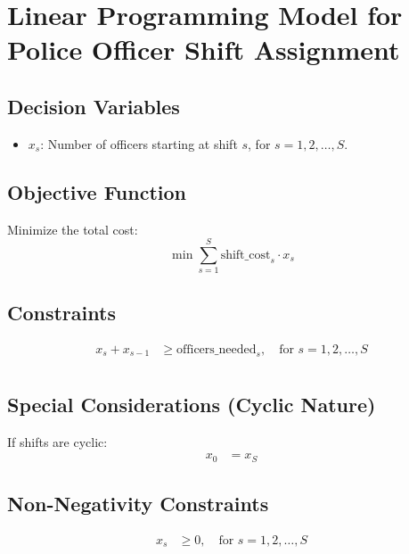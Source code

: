 \documentclass{article}
\begin{document}
\section*{Linear Programming Model for Police Officer Shift Assignment}

\subsection*{Decision Variables}
\begin{itemize}
    \item \( x_s \): Number of officers starting at shift \( s \), for \( s = 1, 2, \ldots, S \).
\end{itemize}

\subsection*{Objective Function}
Minimize the total cost:
\[
\min \sum_{s=1}^{S} \text{shift\_cost}_s \cdot x_s
\]

\subsection*{Constraints}
\begin{align*}
x_s + x_{s-1} & \geq \text{officers\_needed}_s, \quad \text{for } s = 1, 2, \ldots, S \\
\end{align*}

\subsection*{Special Considerations (Cyclic Nature)}
If shifts are cyclic:
\begin{align*}
x_0 & = x_S
\end{align*}

\subsection*{Non-Negativity Constraints}
\begin{align*}
x_s & \geq 0, \quad \text{for } s = 1, 2, \ldots, S
\end{align*}
\end{document}
